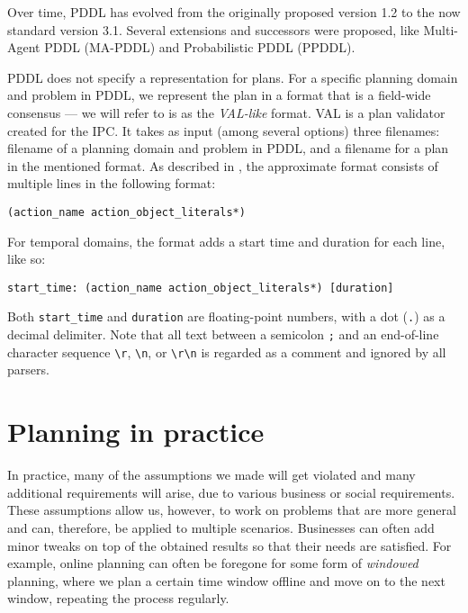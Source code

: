 Over time, PDDL has evolved from the originally proposed version 1.2
to the now standard version 3.1. Several extensions and successors were proposed,
like Multi-Agent PDDL
(MA-PDDL) and
Probabilistic PDDL
(PPDDL).

PDDL does not specify a representation for plans. For a specific planning domain and problem in PDDL,
we represent the plan in a format that is a field-wide consensus --- we will refer to is
as the \textit{VAL-like} format. VAL \citep{Howey2003} is a plan validator created for the IPC.
It takes as input (among several options) three filenames: filename of a planning domain and
problem in PDDL, and a filename for a plan in the mentioned format.
As described in \citet[Figure~2]{Howey2003}, the approximate format
consists of multiple lines in the following format:
\begin{center}
\verb+(action_name action_object_literals*)+
\end{center}
For temporal domains, the format adds a start time and duration for each line, like so:
\begin{center}
\verb+start_time: (action_name action_object_literals*) [duration]+
\end{center}
Both \verb+start_time+ and \verb+duration+ are floating-point numbers, with a dot
(\verb+.+) as a decimal delimiter.
Note that all text between a semicolon \verb+;+ and an end-of-line character sequence \verb+\r+, \verb+\n+, or \verb+\r\n+ is regarded as a comment and ignored by all parsers.







\section{Planning in practice}

In practice, many of the assumptions we made will get violated and many additional requirements will arise,
due to various business or social requirements.
These assumptions allow us, however, to work
on problems that are more general and can, therefore, be applied to multiple scenarios.
Businesses can often add minor tweaks on top of the obtained results so that
their needs are satisfied. 
For example, online planning can often be foregone for some form of \textit{windowed} planning,
where we plan a certain time window offline and move on to the next window,
repeating the process regularly.

